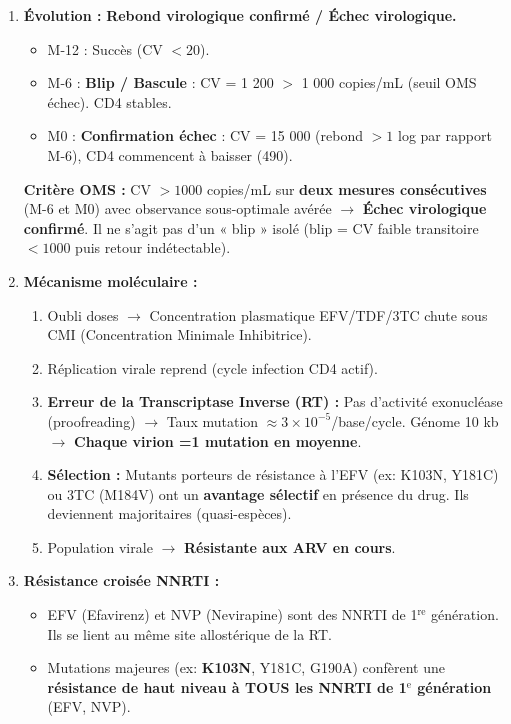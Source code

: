 \documentclass[11pt]{article}
\begin{document}
\begin{exoresolu}
\begin{enumerate}
    \item \textbf{Évolution :} \textbf{Rebond virologique confirmé / Échec virologique.}
    \begin{itemize}
        \item M-12 : Succès (CV $< 20$).
        \item M-6 : \textbf{Blip / Bascule} : CV = 1 200 $>$ 1 000 copies/mL (seuil OMS échec). CD4 stables.
        \item M0 : \textbf{Confirmation échec} : CV = 15 000 (rebond $> 1$ log par rapport M-6), CD4 commencent à baisser (490).
    \end{itemize}
    \textbf{Critère OMS :} CV $> 1000$ copies/mL sur \textbf{deux mesures consécutives} (M-6 et M0) avec observance sous-optimale avérée $\rightarrow$ \textbf{Échec virologique confirmé}. Il ne s'agit pas d'un « blip » isolé (blip = CV faible transitoire $< 1000$ puis retour indétectable).
    \item \textbf{Mécanisme moléculaire :}
    \begin{enumerate}
        \item Oubli doses $\rightarrow$ Concentration plasmatique EFV/TDF/3TC chute sous CMI (Concentration Minimale Inhibitrice).
        \item Réplication virale reprend (cycle infection CD4 actif).
        \item \textbf{Erreur de la Transcriptase Inverse (RT) :} Pas d'activité exonucléase (proofreading) $\rightarrow$ Taux mutation $\approx 3 \times 10^{-5}$/base/cycle. Génome 10 kb $\rightarrow$ \textbf{Chaque virion =1 mutation en moyenne}.
                  \item \textbf{Sélection :} Mutants porteurs de résistance à l'EFV (ex: K103N, Y181C) ou 3TC (M184V) ont un \textbf{avantage sélectif} en présence du drug. Ils deviennent majoritaires (quasi-espèces).
                  \item Population virale $\rightarrow$ \textbf{Résistante aux ARV en cours}.
    \end{enumerate}
    \item \textbf{Résistance croisée NNRTI :}
    \begin{itemize}
        \item EFV (Efavirenz) et NVP (Nevirapine) sont des NNRTI de 1$^{\text{re}}$ génération. Ils se lient au même site allostérique de la RT.
        \item Mutations majeures (ex: \textbf{K103N}, Y181C, G190A) confèrent une \textbf{résistance de haut niveau à TOUS les NNRTI de 1$^{\text{e}}$ génération} (EFV, NVP).

\end{itemize}
\end{enumerate}
\end{exoresolu}
\end{document}
